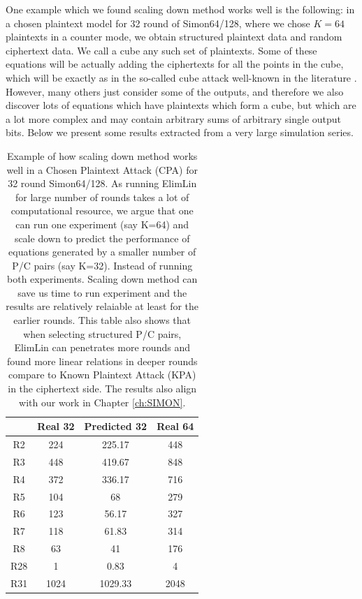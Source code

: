 One example which we found scaling down method works well is the following: in a chosen plaintext model for 32 round of Simon64/128, where we chose $K=64$ plaintexts in a counter mode, we obtain structured plaintext data and random ciphertext data. We call a cube any such set of plaintexts. 
Some of these equations will be actually adding the ciphertexts for all the points in the cube, which will be exactly as in the so-called cube attack well-known in the literature \cite{dinur2009cube}. However, many others just consider some of the outputs, and therefore we also discover lots of equations which have plaintexts which form a cube, but which are a lot more complex and may contain arbitrary sums of arbitrary single output bits.  
Below we present some results extracted from a very large simulation series.
 
\begin{table}[h!]
	\caption[Scaling down method results for 32 Rounds SIMON]{Example of how scaling down method works well in a Chosen Plaintext Attack (CPA) for 32 round Simon64/128. As running ElimLin for large number of rounds takes a lot of computational resource, we argue that one can run one experiment (say K=64) and scale down to predict the performance of equations generated by a smaller number of P/C pairs (say K=32). Instead of running both experiments. Scaling down method can save us time to run experiment and the results are relatively relaiable at least for the earlier rounds. This table also shows that when selecting structured P/C pairs, ElimLin can penetrates more rounds and found more linear relations in deeper rounds compare to Known Plaintext Attack (KPA) in the ciphertext side. The results also align with our work in Chapter \ref{ch:SIMON}. } \label{tab:scallingdownworks} \centering
	\begin{tabular}{|c|c|c|c|}
		\hline
		& Real 32 & Predicted 32 & Real 64 \\ \hline
		R2  & 224     & 225.17     & 448     \\ \hline
		R3  & 448     & 419.67     & 848     \\ \hline
		R4  & 372     & 336.17     & 716     \\ \hline
		R5  & 104     & 68         & 279     \\ \hline
		R6  & 123     & 56.17      & 327     \\ \hline
		R7  & 118     & 61.83      & 314     \\ \hline
		R8  & 63      & 41         & 176     \\ \hline
		R28 & 1       & 0.83       & 4       \\ \hline
		R31 & 1024    & 1029.33    & 2048    \\ \hline
	\end{tabular}
\end{table}

